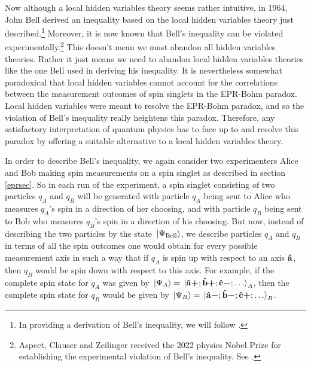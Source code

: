 Now although a local hidden variables theory seems rather intuitive, in 1964, John Bell derived an inequality based on the local hidden variables theory just described.\footnote{In providing a derivation of Bell's inequality, we will follow \cite[241-249]{Sakurai}.} Moreover, it is now known that Bell's inequality can be violated experimentally.\footnote{Aspect, Clauser and Zeilinger received the 2022 physics Nobel Prize for establishing the experimental violation of Bell's inequality. See \cite{Nobel2022}.} This doesn't mean we must abandon all hidden variables theories. Rather it just means we need to abandon local hidden variables theories like the one Bell used in deriving his inequality.  It is nevertheless somewhat paradoxical that local hidden variables cannot account for the correlations between the measurement outcomes of spin singlets in the EPR-Bohm paradox. Local hidden variables were meant to resolve the EPR-Bohm paradox, and so the violation of Bell's inequality really heightens this paradox. Therefore, any satisfactory interpretation of quantum physics has to face up to and resolve this paradox by offering a suitable alternative to a local hidden variables theory. 

In order to describe Bell's inequality, we again consider two experimenters Alice and Bob making spin measurements on a spin singlet as described in section \ref{eprsec}. So in each run of the experiment, a spin singlet consisting of two particles $q_A$ and $q_B$ will be generated with particle $q_A$ being sent to Alice who measures $q_A$'s spin in a direction of her choosing, and with particle $q_B$ being sent to Bob who measures $q_B$'s spin in a direction of his choosing.  But now, instead of describing the two particles by the state $\ket*{\Psi_{\text{Bell}}}$, we describe particles $q_A$ and $q_B$ in terms of all the spin outcomes one would obtain for every possible measurement axis in such a way that if $q_A$ is spin up with respect to an axis $\vb{\hat{{a}}}$, then $q_B$ would be spin down with respect to this axis. For example, if the complete spin state for $q_A$ was given by $\ket*{\Psi_A}=\ket*{{\vb{\hat{{a}}}\bm{+}};{\vb{\hat{{b}}}\bm{+}};{\vb{\hat{{c}}}\bm{-}};\ldots}_A$, then the complete spin state for $q_B$ would be given by $\ket*{\Psi_B}=\ket*{{\vb{\hat{{a}}}\bm{-}};{\vb{\hat{{b}}}\bm{-}};{\vb{\hat{{c}}}\bm{+}};\ldots}_B$.

